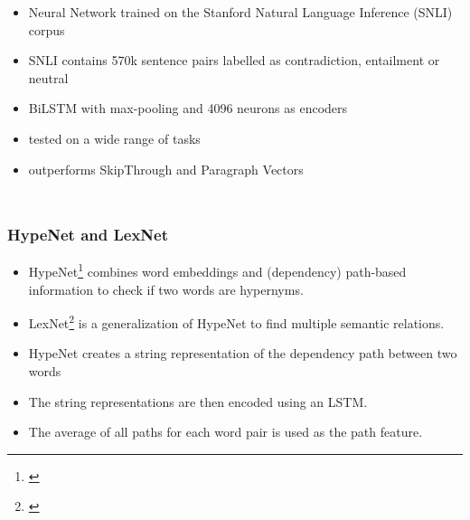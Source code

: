 \documentclass[11pt,aspectratio=169,usenames,dvipsnames]{beamer}
\begin{document}
    \begin{frame}[t]
        \begin{columns}
            \column{2.8in}
            \begin{itemize}
                \item<1-> Neural Network trained on the Stanford Natural Language Inference (SNLI) corpus
                \item<1-> SNLI contains 570k sentence pairs labelled as contradiction, entailment or neutral
                \item<2-> BiLSTM with max-pooling and 4096 neurons as encoders
                \item<2-> tested on a wide range of tasks
                \item<2->  outperforms SkipThrough and Paragraph Vectors
            \end{itemize}
            \column{3in}
        \end{columns}
    \end{frame}

    \begin{frame}[t]
        \frametitle{HypeNet and LexNet}
        \begin{itemize}
            \item HypeNet\footnote{\cite{DBLP:conf/acl/ShwartzGD16}} combines word embeddings and (dependency) path-based information to check if two words are hypernyms.
            \item LexNet\footnote{\cite{DBLP:journals/corr/ShwartzD16}} is a generalization of HypeNet to find multiple semantic relations.\pause
            \item HypeNet creates a string representation of the dependency path between two words
            \item The string representations are then encoded using an LSTM.
            \item The average of all paths for each word pair is used as the path feature.
        \end{itemize}
    \end{frame}
\end{document}
